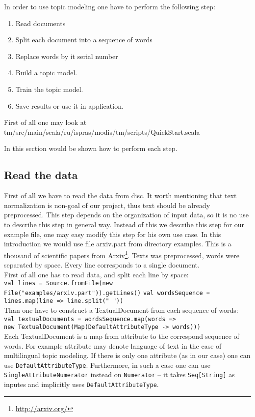 In order to use topic modeling one have to perform the following step:
\begin{enumerate}
    \item Read documents
    \item Split each document into a sequence of words
    \item Replace words by it serial number
    \item Build a topic model.
    \item Train the topic model.
    \item Save results or use it in application. 
\end{enumerate}

First of all one may look at tm/src/main/scala/ru/ispras/modis/tm/scripts/QuickStart.scala

In this section would be shown how to perform each step. 
\subsection*{Read the data}
    First of all we have to read the data from disc. It worth mentioning that text normalization is non\--goal of our project, thus text should be already preprocessed. 
    This step depends on the organization of input data, so it is
    no use to describe this step in general way. Instead of this we describe this step for our example file, one may easy modify this step for his own use case. %
    In this introduction we would use file arxiv.part from directory examples. This is a thousand of scientific  papers 
    from Arxiv\footnote{\url{http://arxiv.org/}}. Texts was preprocessed, words were separated by space. Every line corresponds
    to a single document.\\
    First of all one has to read data, and split each line by space:\\
    \texttt{val lines = Source.fromFile(new File("examples/arxiv.part")).getLines()}
    \texttt{val wordsSequence = lines.map(line => line.split(" "))}\\
    Than one have to construct a TextualDocument from each sequence of words:\\
    \texttt{val textualDocuments = wordsSequence.map(words => \\  new TextualDocument(Map(DefaultAttributeType -> words)))}\\
    Each TextualDocument is a map from attribute to the correspond sequence of words. For example attribute may denote language of
    text in the case of multilingual topic modeling. 
    If there is only one attribute (as in our case) one can use \texttt{DefaultAttributeType}.  Furthermore, in such a case one can use \texttt{SingleAttributeNumerator} instead on \texttt{Numerator} -- it takes \texttt{Seq[String]} as inputes and implicitly uses \texttt{DefaultAttributeType}.
